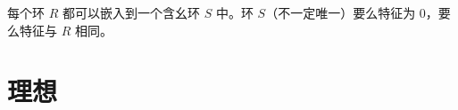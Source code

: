 \begin{theorem}
  每个环 $R$ 都可以嵌入到一个含幺环 $S$ 中。环 $S$（不一定唯一）要么特征为 $0$，要么特征与 $R$ 相同。
\end{theorem}


\section{理想}







\section{}







\section{}







\section{}







\section{}







\section{}







\section{}






